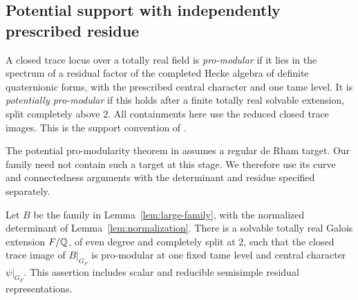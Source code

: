 \subsection{Potential support with independently prescribed residue}

A closed trace locus over a totally real field is \emph{pro-modular}
if it lies in the spectrum of a residual factor of the completed
Hecke algebra of definite quaternionic forms, with the prescribed
central character and one tame level.  It is \emph{potentially
pro-modular} if this holds after a finite totally real solvable
extension, split completely above $2$.  All containments here use
the reduced closed trace images.  This is the support convention of
\cite[Section~2.3]{FM2}.

The potential pro-modularity theorem in \cite[Theorem~7.1]{FM2}
assumes a regular de Rham target.  Our family need not contain such
a target at this stage.  We therefore use its curve and connectedness
arguments with the determinant and residue specified separately.

\begin{proposition}\label{prop:potential-support}
Let $B$ be the family in Lemma~\ref{lem:large-family}, with the
normalized determinant of Lemma~\ref{lem:normalization}.  There is a
solvable totally real Galois extension $F/\mathbb Q$, of even degree and
completely split at $2$, such that the closed trace image of
$B|_{G_F}$ is pro-modular at one fixed tame level and central
character $\psi|_{G_F}$.  This assertion includes scalar and
reducible semisimple residual representations.
\end{proposition}

